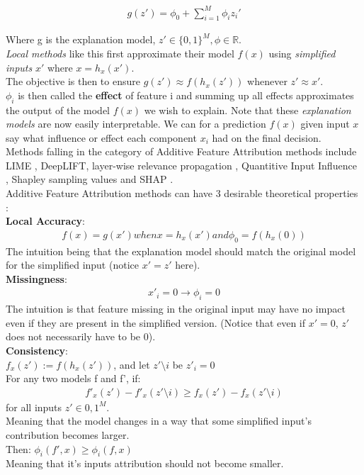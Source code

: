\documentclass[conference]{IEEEtran}
\begin{document}
\begin{align}
	g(z') = \phi_0 + \sum_{i=1}^{M}\phi_i z_{i}'
\end{align}

Where g is the explanation model, $z' \in \{0,1\}^M, \phi \in \mathbb{R}$. \\
\textit{Local methods} like this first approximate their model $f(x)$ using \textit{simplified inputs} $x'$ where $x = h_x(x')$.\\
The objective is then to ensure $g(z') \approx f(h_x(z'))$ whenever $z' \approx x'$. \\
$\phi_i$ is then called the \textbf{effect} of feature i and summing up all effects approximates the output of the model $f(x)$ we wish to explain. Note that these \textit{explanation models} are now easily interpretable. We can for a prediction $f(x)$ given input $x$  say what influence or effect each component $x_i$ had on the final decision.\\
Methods falling in the category of Additive Feature Attribution methods include LIME \cite{b4}, DeepLIFT\cite{b5}, layer-wise relevance propagation \cite{b6}, Quantitive Input Influence \cite{b7}, Shapley sampling values \cite{b8} and SHAP \cite{b2}.\\

Additive Feature Attribution methods can have 3 desirable theoretical properties \cite{b2}:\\

\textbf{Local Accuracy}: \\
\begin{align}
f(x) = g(x') when x = h_x(x') and \phi_0 = f(h_x(0))
\end{align}
The intuition being that the explanation model should match the original model for the simplified input (notice $x' = z'$ here). \\

\textbf{Missingness}: \\
\begin{align}
x'_i = 0 \rightarrow \phi_i = 0
\end{align}
The intuition is that feature missing in the original input may have no impact even if they are present in the simplified version. (Notice that even if $x' = 0$, $z'$ does not necessarily have to be 0).\\

\textbf{Consistency}: \\
$f_x(z') := f(h_x(z'))$, and let $z' \setminus i$ be $z'_i = 0$\\
For any two models f and f', if:
\begin{align}
f'_x(z') - f'_x(z' \setminus i) \geq f_x(z') - f_x(z' \setminus i)
\end{align}
for all inputs $z' \in {0,1}^M$. \\
Meaning that the model changes in a way that some simplified input's contribution becomes larger.\\
Then: $ \phi_i(f', x) \geq \phi_i(f,x)$ \\
Meaning that it's inputs attribution should not become smaller.\\
\end{document}
